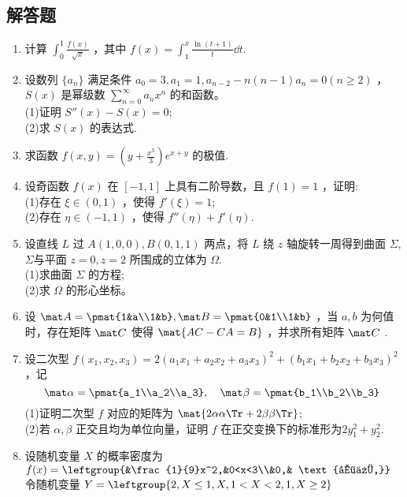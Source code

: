 \subsection{解答题}
\begin{enumerate}
\item 计算 $\displaystyle \int_{0}^{1}\frac{f(x)}{\sqrt{x}}$ ，其中  $\displaystyle f(x)=\int_{1}^{x}\frac{\ln(t+1)}{t}\dd{t}$.
\item 设数列 $\{a_n\}$ 满足条件 $a_0=3,a_1=1,a_{n-2}-n(n-1)a_n=0(n\ge 2)$ ， $S(x)$ 是幂级数 $\displaystyle \sum_{n=0}^\infty a_nx^n$ 的和函数。\\
(1)证明 $S''(x)-S(x)=0$;\\
(2)求 $S(x)$ 的表达式.
\item 求函数 $\displaystyle f(x,y)=(y+\frac{x^3}{3})e^{x+y}$ 的极值.
\item 设奇函数 $f(x)$ 在 $[-1,1]$ 上具有二阶导数，且 $f(1)=1$ ，证明:\\
(1)存在 $\xi \in(0,1)$  ，使得 $f'(\xi)=1$;\\
(2)存在 $\eta \in (-1,1)$ ，使得 $f''(\eta)+f'(\eta)$.
\item 设直线 $L$ 过 $A(1,0,0),B(0,1,1)$ 两点，将 $L$ 绕 $z$ 轴旋转一周得到曲面 $\Sigma$, $\Sigma$与平面 $z=0,z=2$  所围成的立体为 $\Omega$.\\
(1)求曲面 $\Sigma$ 的方程;\\
(2)求 $\Omega$ 的形心坐标。
\item 设 $\mat A=\pmat{1&a\\1&b},\mat B=\pmat{0&1\\1&b}$ ，当 $a,b$ 为何值时，存在矩阵 $\mat C$ 使得 $\mat {AC-CA=B}$ ，并求所有矩阵 $\mat C$  .
\item  设二次型 $f(x_1,x_2,x_3)=2(a_1x_1+a_2x_2+a_3x_3)^2+(b_1x_1+b_2x_2+b_3x_3)^2$  ，记\begin{equation}
\mat \alpha=\pmat{a_1\\a_2\\a_3},\quad
\mat \beta=\pmat{b_1\\b_2\\b_3}~
\end{equation}
(1)证明二次型 $f$ 对应的矩阵为 $\mat {2\alpha\alpha \Tr +2\beta\beta \Tr}$;\\
(2)若 $\alpha,\beta$ 正交且均为单位向量，证明 $f$ 在正交变换下的标准形为$2y_1^2+y_2^2$.
\item 设随机变量 $X$ 的概率密度为 $f(x)=\leftgroup{&\frac{1}{9}x^2,&0<x<3\\&0,& \text{其他,}}$令随机变量 $Y=\leftgroup{2,X\le 1,X,1<X<2,1,X \ge 2}$
\end{enumerate}